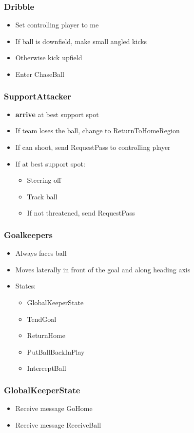 \documentclass[handout,t,compress]{beamer}
\newcommand{\bframe}[1]{\begin{frame}[fragile]\frametitle{{#1}}}
\begin{document}
\bframe{Dribble}
\begin{itemize}
\item Set controlling player to me
\item If ball is downfield, make small angled kicks
\item Otherwise kick upfield
\item Enter ChaseBall
\end{itemize}
\end{frame}

\bframe{SupportAttacker}
\begin{itemize}
\item {\bf arrive} at best support spot
\item If team loses the ball, change to ReturnToHomeRegion
\item If can shoot, send RequestPass to controlling player
\item If at best support spot:
\begin{itemize}
\item Steering off
\item Track ball
\item If not threatened, send RequestPass
\end{itemize}
\end{itemize}
\end{frame}

\bframe{Goalkeepers}
\begin{itemize}
\item Always faces ball
\item Moves laterally in front of the goal and along heading axis
\item States:
\begin{itemize}
\item GlobalKeeperState
\item TendGoal
\item ReturnHome
\item PutBallBackInPlay
\item InterceptBall
\end{itemize}
\end{itemize}
\end{frame}

\bframe{GlobalKeeperState}
\begin{itemize}
\item Receive message GoHome
\item Receive message ReceiveBall
\end{itemize}
\end{frame}
\end{document}
